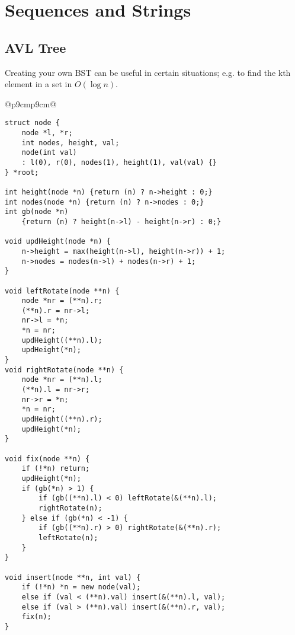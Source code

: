 \documentclass[letterpaper]{article}
\begin{document}
\clearpage

\section{Sequences and Strings}

\subsection {AVL Tree}

Creating your own BST can be useful in certain situations; e.g. to find the kth element in a set in $O\left(\log n\right)$.

\begin{tabular}{@{}p{9cm}p{9cm}@{}}
\begin{lstlisting}
struct node {
	node *l, *r;
	int nodes, height, val;
	node(int val)
	: l(0), r(0), nodes(1), height(1), val(val) {}
} *root;

int height(node *n) {return (n) ? n->height : 0;}
int nodes(node *n) {return (n) ? n->nodes : 0;}
int gb(node *n)
	{return (n) ? height(n->l) - height(n->r) : 0;}

void updHeight(node *n) {
	n->height = max(height(n->l), height(n->r)) + 1;
	n->nodes = nodes(n->l) + nodes(n->r) + 1;
}

void leftRotate(node **n) {
	node *nr = (**n).r;
	(**n).r = nr->l;
	nr->l = *n;
	*n = nr;
	updHeight((**n).l);
	updHeight(*n);
}
void rightRotate(node **n) {
	node *nr = (**n).l;
	(**n).l = nr->r;
	nr->r = *n;
	*n = nr;
	updHeight((**n).r);
	updHeight(*n);
}

void fix(node **n) {
	if (!*n) return;
	updHeight(*n);
	if (gb(*n) > 1) {
		if (gb((**n).l) < 0) leftRotate(&(**n).l);
		rightRotate(n);
	} else if (gb(*n) < -1) {
		if (gb((**n).r) > 0) rightRotate(&(**n).r);
		leftRotate(n);
	}
}

void insert(node **n, int val) {
	if (!*n) *n = new node(val);
	else if (val < (**n).val) insert(&(**n).l, val);
	else if (val > (**n).val) insert(&(**n).r, val);
	fix(n);
}


\end{lstlisting}
\end{tabular}
\end{document}
